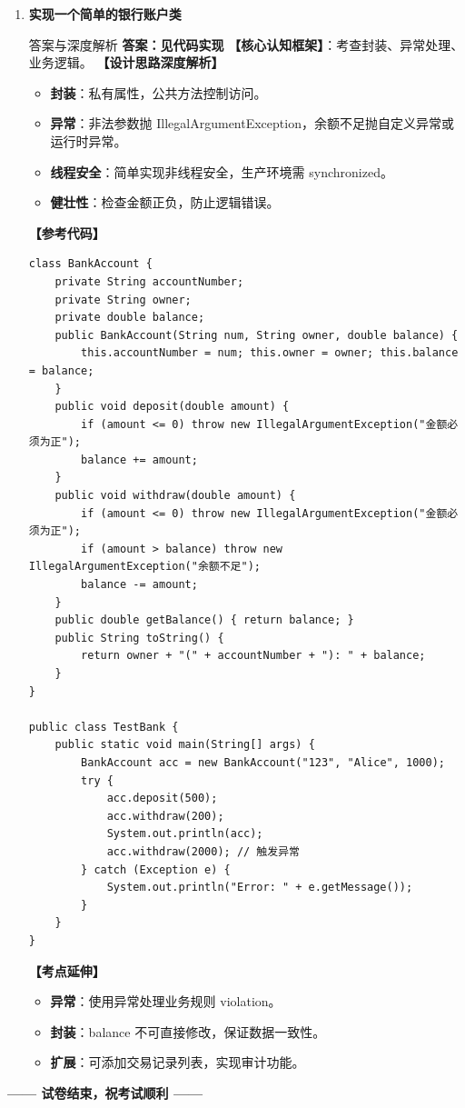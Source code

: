 ﻿\documentclass[12pt, a4paper]{ctexart}
\begin{document}
\begin{enumerate}[label=\arabic*.]
	\item \textbf{实现一个简单的银行账户类}
	      \begin{bluebox}{答案与深度解析}
		      \textbf{答案：见代码实现}
		      \textbf{【核心认知框架】}：考查封装、异常处理、业务逻辑。
		      \textbf{【设计思路深度解析】}
		      \begin{itemize}[leftmargin=*, nosep]
			      \item \textbf{封装}：私有属性，公共方法控制访问。
			      \item \textbf{异常}：非法参数抛 IllegalArgumentException，余额不足抛自定义异常或运行时异常。
			      \item \textbf{线程安全}：简单实现非线程安全，生产环境需 synchronized。
			      \item \textbf{健壮性}：检查金额正负，防止逻辑错误。
		      \end{itemize}
		      \textbf{【参考代码】}
		      \begin{lstlisting}
class BankAccount {
    private String accountNumber;
    private String owner;
    private double balance;
    public BankAccount(String num, String owner, double balance) {
        this.accountNumber = num; this.owner = owner; this.balance = balance;
    }
    public void deposit(double amount) {
        if (amount <= 0) throw new IllegalArgumentException("金额必须为正");
        balance += amount;
    }
    public void withdraw(double amount) {
        if (amount <= 0) throw new IllegalArgumentException("金额必须为正");
        if (amount > balance) throw new IllegalArgumentException("余额不足");
        balance -= amount;
    }
    public double getBalance() { return balance; }
    public String toString() {
        return owner + "(" + accountNumber + "): " + balance;
    }
}

public class TestBank {
    public static void main(String[] args) {
        BankAccount acc = new BankAccount("123", "Alice", 1000);
        try {
            acc.deposit(500);
            acc.withdraw(200);
            System.out.println(acc);
            acc.withdraw(2000); // 触发异常
        } catch (Exception e) {
            System.out.println("Error: " + e.getMessage());
        }
    }
}
\end{lstlisting}
		      \textbf{【考点延伸】}
		      \begin{itemize}[leftmargin=*, nosep]
			      \item \textbf{异常}：使用异常处理业务规则 violation。
			      \item \textbf{封装}：balance 不可直接修改，保证数据一致性。
			      \item \textbf{扩展}：可添加交易记录列表，实现审计功能。
		      \end{itemize}
	      \end{bluebox}
\end{enumerate}

\begin{center}
	{\large\bfseries\color{myblue} —— 试卷结束，祝考试顺利 ——}
\end{center}
\end{document}
